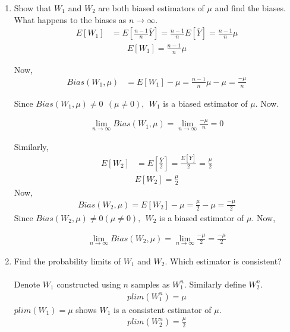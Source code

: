 \begin{enumerate}

\item{
\noindent Show that $W_1$ and $W_2$ are both biased estimators of $\mu$ and find the biases. What happens to the biases as $n \to \infty$. 
\begin{align*}
E[W_1] &= E[\frac{n - 1}{n}\bar{Y}] = \frac{n - 1}{n}E[\bar{Y}] = \frac{n - 1}{n}\mu
\end{align*}
\begin{align*}
\boxed{E[W_1] = \frac{n - 1}{n}\mu}
\end{align*}

Now,
\begin{align*}
Bias(W_1 , \mu) &= E[W_1] -\mu = \frac{n - 1}{n}\mu - \mu = \frac{-\mu}{n}
\end{align*}

\noindent Since $Bias(W_1 , \mu) \neq 0 \ \ (\mu \neq 0), \ \ W_1$ is a biased estimator of $\mu$. Now.

\begin{align*}
\lim_{n \to \infty} Bias(W_1 , \mu) = \lim_{n \to \infty} \frac{-\mu}{n} = 0 
\end{align*}

\noindent Similarly, 
\begin{align*}
E[W_2] &= E[\frac{\bar{Y}}{2}] = \frac{E[\bar{Y}]}{2} = \frac{\mu}{2}
\end{align*}
\begin{align*}
\boxed{E[W_2] = \frac{\mu}{2}}
\end{align*}
Now,
\begin{align*}
Bias(W_2 , \mu) = E[W_2]-\mu = \frac{\mu}{2} - \mu = \frac{-\mu}{2}
\end{align*}
\noindent Since $Bias(W_2 , \mu) \neq 0 (\mu \neq 0), \ \ W_2$ is a biased estimator of $\mu$. Now, 

\begin{align*}
\lim_{n \to \infty} Bias(W_2 , \mu) = \lim_{n \to \infty} \frac{-\mu}{2} = \frac{-\mu}{2} 
\end{align*}

}

\item

\noindent Find the probability limits of $W_1$ and $W_2$. Which estimator is consistent?\\ \\
\noindent Denote $W_1$ constructed using $n$ samples as $W_1^n$. Similarly define $W_2^n$.
\begin{align*}
\boxed{plim(W_1^n) = \mu}
\end{align*}
$plim(W_1) = \mu$ shows $W_1$ is a consistent estimator of $\mu$.
\begin{align*}
\boxed{plim(W_2^n)= \frac{\mu}{2}}
\end{align*}


\end{enumerate}

